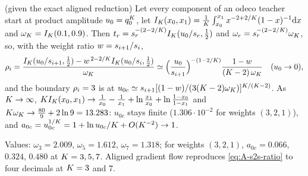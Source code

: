 \begin{proposition}\label{prop:A-s2s-aligned}
  \proven{} (given the exact aligned reduction) 
  Let every component of an odeco teacher start at product amplitude $u_0=q_0^K$, let
  $I_K(x_0,x_1)=\frac1{K}\int_{x_0}^{x_1}x^{-2+2/K}(1-x)^{-1}\mathrm{d} x$ and $\omega_K=I_K(0.1,0.9)$. Then
  $t_{r}=s_{r}^{-(2-2/K)}I_K(u_0/s_{r},\frac12)$ and $\omega_{r}=s_{r}^{-(2-2/K)}\omega_K$, so, with the weight ratio
  $w=s_{i+1}/s_{i}$,
  \begin{equation}\label{eq:A-s2s-ratio}
    \rho_{i}=\frac{I_K(u_0/s_{i+1},\frac12)-w^{\,2-2/K}I_K(u_0/s_{i},\frac12)}{\omega_K}
    \simeq\Big(\frac{u_0}{s_{i+1}}\Big)^{-(1-2/K)}\frac{1-w}{(K-2)\,\omega_K}\quad(u_0\to0),
  \end{equation}
  and the boundary $\rho_{i}=3$ is at $u_{0c}\simeq s_{i+1}[(1-w)/(3(K-2)\omega_K)]^{K/(K-2)}$. As $K\to\infty$,
  $K I_K(x_0,x_1)\to\frac1{x_0}-\frac1{x_1}+\ln\frac{x_1}{x_0}+\ln\frac{1-x_0}{1-x_1}$ and $K\omega_K\to\frac{80}9+2\ln9=13.283$:
  $u_{0c}$ stays finite ($1.306\cdot10^{-2}$ for weights $(3,2,1)$), and $a_{0c}=u_{0c}^{1/K}=1+\ln u_{0c}/K+O(K^{-2})\to1$.
\end{proposition}
Values: $\omega_3=2.009$, $\omega_5=1.612$, $\omega_7=1.318$; for weights $(3,2,1)$, $a_{0c}=0.066$, $0.324$, $0.480$
at $K=3,5,7$. Aligned gradient flow reproduces \eqref{eq:A-s2s-ratio} to four decimals at $K=3$ and 7.

